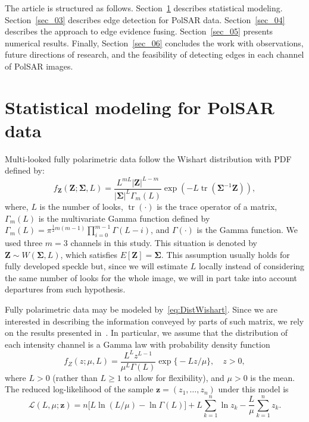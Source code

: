 \documentclass[journal]{IEEEtran}
\DeclareMathOperator{\traco}{tr}
\begin{document}


The article is structured as follows.
Section~\ref{sec_02} describes statistical modeling.
Section~\ref{sec_03} describes edge detection for PolSAR data.
Section~\ref{sec_04} describes the approach to edge evidence fusing.
Section~\ref{sec_05} presents numerical results.
Finally, Section~\ref{sec_06} concludes the work with observations, future directions of research, and the feasibility of detecting edges in each channel of PolSAR images.

\section{Statistical modeling for PolSAR data}\label{sec_02}

Multi-looked fully polarimetric data follow the Wishart distribution with PDF defined by:
\begin{equation}
    f_{\mathbf{Z}}(\mathbf{Z};\mathbf{\Sigma},L)=\frac{L^{mL}|\mathbf{Z}|^{L-m}}{|\mathbf{\Sigma}|^{L}\Gamma_m(L)} \exp(-L\traco(\mathbf{\Sigma}^{-1}\mathbf{Z})),
    \label{eq:DistWishart}
\end{equation} 
where, $L$ is the number of looks, $\traco(\cdot)$ is the trace operator of a matrix, $\Gamma_m(L)$ is the multivariate Gamma function defined by $
	\Gamma_m(L)=\pi^{\frac{1}{2}m(m-1)} \prod_{i=0}^{m-1}\Gamma(L-i)$,
and $\Gamma(\cdot)$ is the Gamma function.
We used three $m=3$ channels in this study. 
This situation is denoted by $\mathbf{Z}\sim W(\mathbf{\Sigma}, L)$, which satisfies $E[\mathbf{Z}]=\mathbf{\Sigma}$. 
This assumption usually holds for fully developed speckle but, since we will estimate $L$ locally instead of considering the same number of looks for the whole image, we will in part take into account departures from such hypothesis.

Fully polarimetric data may be modeled by~\eqref{eq:DistWishart}.
Since we are interested in describing the information conveyed by parts of such matrix, we rely on the results presented in~\cite{hsbmp}.
In particular, we assume that the distribution of each intensity channel is a 
Gamma law with probability density function
\begin{equation}
f_Z(z;\mu,L)=\frac{L^{L}z^{L-1}}{\mu^{L}\Gamma(L)} \exp\big\{-Lz/\mu\big\},\quad z>0,
\label{func_dens_uni_gamma}
\end{equation}
where $L>0$ (rather than $L\geq1$ to allow for flexibility), and
$\mu>0$ is the mean.
The reduced log-likelihood of the sample $\bm z = (z_1,\dots,z_n)$ under this model is
\begin{equation}
\mathcal L( L,\mu; \bm z) = 
n \big[L\ln (L / \mu) - \ln \Gamma(L)\big]
+L \sum_{k=1}^{n}\ln z_k -\frac{L}{\mu}\sum_{k=1}^{n} z_k.
\label{eq:LogLikelihoodGamma}
\end{equation}
\end{document}
